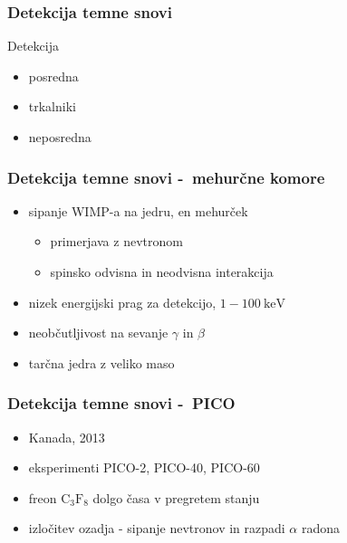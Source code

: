 \documentclass[14pt, t]{beamer}
\begin{document}
\begin{frame}
\frametitle{Detekcija temne snovi}
\begin{block}{Detekcija}
\begin{itemize}
  \item <1-> posredna
  \item <2-> trkalniki
  \item <3-> neposredna
\end{itemize}
\end{block}
\end{frame}

\begin{frame}
\frametitle{Detekcija temne snovi -~mehurčne komore}
\begin{itemize}
  \item <1-> sipanje WIMP-a na jedru, en mehurček
        \begin{itemize}
          \item primerjava z nevtronom
          \item spinsko odvisna in neodvisna interakcija
        \end{itemize}
  \item <2-> nizek energijski prag za detekcijo, \( 1 - 100 \ \mathrm{keV} \)
  \item <3-> neobčutljivost na sevanje \( \gamma \) in \( \beta \)
  \item<4-> tarčna jedra z veliko maso
\end{itemize}
\end{frame}

\begin{frame}
\frametitle{Detekcija temne snovi -~PICO}
\begin{itemize}
  \item Kanada, 2013
  \item eksperimenti PICO-2, PICO-40, PICO-60
  \item freon \( \mathrm{C}_3 \mathrm{F_8} \) dolgo časa v pregretem stanju
  \item izločitev ozadja - sipanje nevtronov in razpadi \( \alpha \) radona
\end{itemize}
\end{frame}
\end{document}

